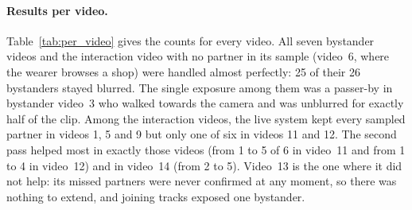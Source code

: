 \paragraph{Results per video.}
Table~\ref{tab:per_video} gives the counts for every video. All seven bystander videos and
the interaction video with no partner in its sample (video~6, where the wearer browses a
shop) were handled almost perfectly: 25 of their 26 bystanders stayed blurred. The single
exposure among them was a passer-by in bystander video~3 who walked towards the camera and
was unblurred for exactly half of the clip. Among the interaction videos, the live system
kept every sampled partner in videos 1, 5 and 9 but only one of six in videos 11 and 12.
The second pass helped most in exactly those videos (from 1 to 5 of 6 in video~11 and from
1 to 4 in video~12) and in video~14 (from 2 to 5). Video~13 is the one where it did not
help: its missed partners were never confirmed at any moment, so there was nothing to
extend, and joining tracks exposed one bystander.

